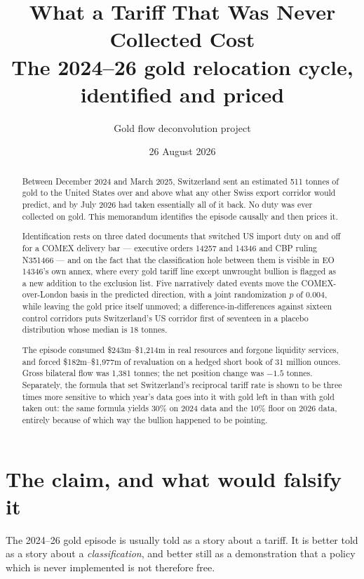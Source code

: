 \documentclass[11pt,a4paper]{article}
\title{\vspace{-1.5cm}What a Tariff That Was Never Collected Cost\\[0.3em]
\large The 2024--26 gold relocation cycle, identified and priced}
\author{Gold flow deconvolution project}
\date{26 August 2026}
\begin{document}
\maketitle

\begin{abstract}
\noindent
Between December 2024 and March 2025, Switzerland sent an estimated 511 tonnes of gold to
the United States over and above what any other Swiss export corridor would predict, and by
July 2026 had taken essentially all of it back. No duty was ever collected on gold. This
memorandum identifies the episode causally and then prices it.

Identification rests on three dated documents that switched US import duty on and off for a
COMEX delivery bar --- executive orders 14257 and 14346 and CBP ruling N351466 --- and on the
fact that the classification hole between them is visible in EO 14346's own annex, where every
gold tariff line except unwrought bullion is flagged as a new addition to the exclusion list.
Five narratively dated events move the COMEX-over-London basis in the predicted direction, with
a joint randomization $p$ of 0.004, while leaving the gold price itself unmoved; a
difference-in-differences against sixteen control corridors puts Switzerland's US corridor first
of seventeen in a placebo distribution whose median is 18 tonnes.

The episode consumed \$243m--\$1,214m in real resources and forgone liquidity services, and
forced \$182m--\$1,977m of revaluation on a hedged short book of 31 million ounces. Gross
bilateral flow was 1,381 tonnes; the net position change was $-1.5$ tonnes. Separately, the
formula that set Switzerland's reciprocal tariff rate is shown to be three times more sensitive
to which year's data goes into it with gold left in than with gold taken out: the same formula
yields 30\% on 2024 data and the 10\% floor on 2026 data, entirely because of which way the
bullion happened to be pointing.
\end{abstract}

\tableofcontents

\section{The claim, and what would falsify it}

The 2024--26 gold episode is usually told as a story about a tariff. It is better told as a
story about a \emph{classification}, and better still as a demonstration that a policy which is
never implemented is not therefore free.
\end{document}
